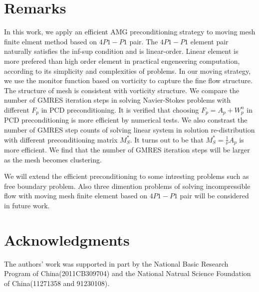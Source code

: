 \documentclass{eajam}
\begin{document}
\section{Remarks}
   \label{sec6} In this work, we apply an efficient AMG
   preconditioning strategy to moving mesh finite elment method based
   on $4P1-P1$ pair. The $4P1-P1$ element pair naturally satisfies the
   inf-sup condition and is linear-order. 
   Linear element is more prefered than high order element in
   practical engeneering computation, according to its simplicity and
   complexities of problems. In our moving strategy, we use the
   monitor function based on vorticity to capture the fine flow
   structure. The structure of mesh is consistent with vorticity
   structure. We compare the number of GMRES iteration steps in
   solving Navier-Stokes problems with different $F_p$ in PCD
   preconditioning. It is verified that choosing $F_p = A_p + W_p^n$
   in PCD preconditioning is more efficient by numerical tests.
   We also constrast the number of GMRES step counts of solving linear 
   system in solution re-distribution with different preconditioning 
   matrix $M_S^*$. It turns out to be that $M_S^* = \frac{1}{\nu}A_p$
   is more efficient. We find that the number of GMRES iteration steps will
   be larger as the mesh becomes clustering. 
   
   We will extend the efficient preconditioning to some intresting 
   problems such as free boundary problem. Also three dimention
   problems of solving incompressible flow with moving mesh finite
   element based on $4P1-P1$ pair will be considered in future work. 

\section*{Acknowledgments}
The authors' work was supported in part by the National Basic Research
Program of China(2011CB309704) and the National Natrual Science
Foundation of China(11271358 and 91230108).
   


\end{document}
